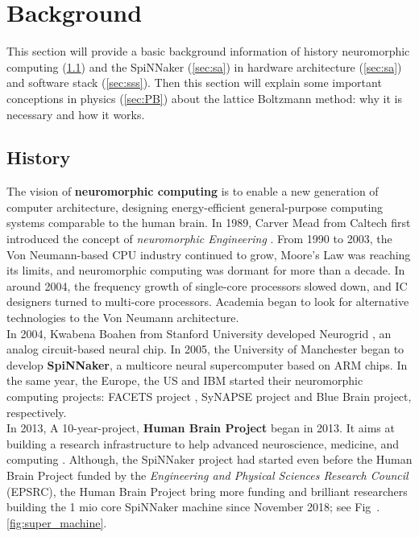 \section{Background} \label{sec:bg}


This section will provide a basic background information of history neuromorphic computing (\ref{sec:sb}) and the SpiNNaker (\ref{sec:sa}) in hardware architecture (\ref{sec:sa}) and software stack (\ref{sec:sss}). Then this section will explain some important conceptions in physics (\ref{sec:PB}) about the lattice Boltzmann method: why it is necessary and how it works. 


\subsection{History} \label{sec:sb}
The vision of \textbf{neuromorphic computing}\cite{mead1980introduction} is to enable a new generation of computer architecture, designing energy-efficient general-purpose computing systems comparable to the human brain. In 1989, Carver Mead from Caltech first introduced the concept of \textit{neuromorphic Engineering} \cite{mead1980introduction}. From 1990 to 2003, the Von Neumann-based CPU industry continued to grow, Moore's Law \cite{schaller1997moore} was reaching its limits, and neuromorphic computing was dormant for more than a decade. In around 2004, the frequency growth of single-core processors slowed down, and IC designers turned to multi-core processors. Academia began to look for alternative technologies to the Von Neumann architecture.\\

In 2004, Kwabena Boahen from Stanford University developed Neurogrid \cite{benjamin2014neurogrid}, an analog circuit-based neural chip. In 2005, the University of Manchester began to develop \textbf{SpiNNaker}, a multicore neural supercomputer based on ARM chips. In the same year, the Europe, the US and IBM started their neuromorphic computing projects: FACETS project \cite{meier2004fast}, SyNAPSE project\cite{park2014impact} and Blue Brain project\cite{gara2005overview}, respectively. \\

In 2013, A 10-year-project, \textbf{Human Brain Project} began in 2013. It aims at building a research infrastructure to help advanced neuroscience, medicine, and computing \cite{hbp}. Although, the SpiNNaker project had started even before the Human Brain Project funded by the \textit{Engineering and Physical Sciences Research Council} (EPSRC), the Human Brain Project bring more funding and brilliant researchers building the 1 mio core SpiNNaker machine since November 2018; see Fig~.\ref{fig:super_machine}.

